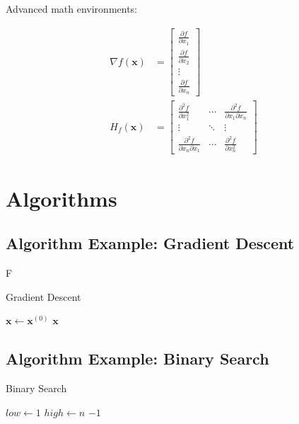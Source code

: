 \documentclass[12pt]{article}
\theoremstyle{definition}
\theoremstyle{remark}
\begin{document}
Advanced math environments:

\begin{align}
    \nabla f(\mathbf{x}) &= \begin{bmatrix}
        \frac{\partial f}{\partial x_1} \\
        \frac{\partial f}{\partial x_2} \\
        \vdots \\
        \frac{\partial f}{\partial x_n}
    \end{bmatrix} \\
    H_f(\mathbf{x}) &= \begin{bmatrix}
        \frac{\partial^2 f}{\partial x_1^2} & \cdots & \frac{\partial^2 f}{\partial x_1 \partial x_n} \\
        \vdots & \ddots & \vdots \\
        \frac{\partial^2 f}{\partial x_n \partial x_1} & \cdots & \frac{\partial^2 f}{\partial x_n^2}
    \end{bmatrix}
\end{align}

\section{Algorithms}

\subsection{Algorithm Example: Gradient Descent}

\begin{algorithm}[H]F
\caption{Gradient Descent}\label{alg:gradient_descent}
$\mathbf{x} \gets \mathbf{x}^{(0)}$\;
\Return $\mathbf{x}$\;
\end{algorithm}

\subsection{Algorithm Example: Binary Search}

\begin{algorithm}[H]
\caption{Binary Search}\label{alg:binary_search}
$low \gets 1$\;
$high \gets n$\;
\Return $-1$\;
\end{algorithm}
\end{document}
